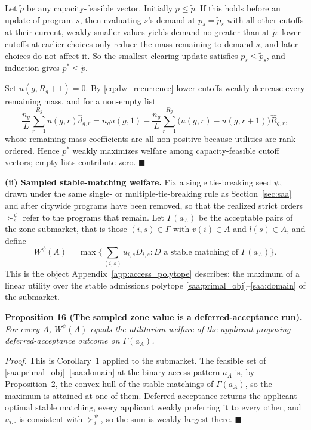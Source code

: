 \documentclass{article}
\begin{document}
Let $\widetilde p$ be any capacity-feasible vector. Initially
$p \le \widetilde p$. If this holds before an update of program $s$, then
evaluating $s$'s demand at $p_s = \widetilde p_s$ with all other cutoffs at
their current, weakly smaller values yields demand no greater than at
$\widetilde p$: lower cutoffs at earlier choices only reduce the mass remaining
to demand $s$, and later choices do not affect it. So the smallest clearing
update satisfies $p_s \le \widetilde p_s$, and induction gives
$p^\ast \le \widetilde p$.

Set $u(g,R_g+1) = 0$. By \eqref{eq:dw_recurrence} lower cutoffs weakly decrease
every remaining mass, and for a non-empty list
\begin{equation}\label{eq:dw_welfare_telescoping}
\frac{n_g}{L}\sum_{r=1}^{R_g}u(g,r)\widehat{d}_{g,r}
= n_g u(g,1)-\frac{n_g}{L}\sum_{r=1}^{R_g}
\big(u(g,r)-u(g,r+1)\big)\widehat{R}_{g,r},
\end{equation}
whose remaining-mass coefficients are all non-positive because utilities are
rank-ordered. Hence $p^\ast$ weakly maximizes welfare among capacity-feasible
cutoff vectors; empty lists contribute zero. $\blacksquare$

\noindent\textbf{(ii) Sampled stable-matching welfare.}
Fix a single tie-breaking seed $\psi$, drawn under the same single- or
multiple-tie-breaking rule as Section~\ref{sec:saa} and after citywide programs
have been removed, so that the realized strict orders $\succ_s^\psi$ refer to
the programs that remain. Let $\Gamma(a_A)$ be the acceptable pairs of the zone
submarket, that is those $(i,s) \in \Gamma$ with $v(i) \in A$ and
$l(s) \in A$, and define
\begin{equation}\label{eq:dw_sampled_value}
W^{\psi}(A) = \max\Big\{ \textstyle\sum_{(i,s)} u_{i,s} D_{i,s}
: D \text{ a stable matching of } \Gamma(a_A) \Big\}.
\end{equation}
This is the object Appendix~\ref{app:access_polytope} describes: the maximum of
a linear utility over the stable admissions polytope
\eqref{saa:primal_obj}--\eqref{saa:domain} of the submarket.

\noindent\textbf{Proposition 16 (The sampled zone value is a deferred-acceptance
run).} \textit{For every $A$, $W^{\psi}(A)$ equals the utilitarian welfare of
the applicant-proposing deferred-acceptance outcome on $\Gamma(a_A)$.}

\textit{Proof.} This is Corollary~1 applied to the submarket. The feasible set
of \eqref{saa:primal_obj}--\eqref{saa:domain} at the binary access pattern
$a_A$ is, by Proposition~2, the convex hull of the stable matchings of
$\Gamma(a_A)$, so the maximum is attained at one of them. Deferred acceptance
returns the applicant-optimal stable matching, every applicant weakly preferring
it to every other, and $u_{i,\cdot}$ is consistent with $\succ_i^\psi$, so the
sum is weakly largest there. $\blacksquare$
\end{document}
